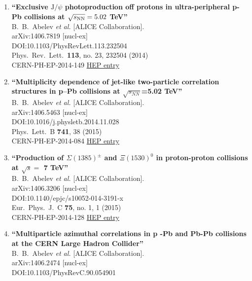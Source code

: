 \begin{enumerate}
\item%
{\bf ``Exclusive $\mathrm{J/}\psi$ photoproduction off protons in ultra-peripheral p-Pb collisions at $\sqrt{s_{\rm NN}}=5.02$ TeV''}
  \\{}B.~B.~Abelev {\it et al.} [ALICE Collaboration].
  \\{}arXiv:1406.7819 [nucl-ex]
  \\{}DOI:10.1103/PhysRevLett.113.232504
  \\{}Phys.\ Rev.\ Lett.\  {\bf 113}, no. 23, 232504 (2014)
  \\{}CERN-PH-EP-2014-149
\href{http://inspirehep.net/record/1303903}{HEP entry}
\item%
{\bf ``Multiplicity dependence of jet-like two-particle correlation structures in p–Pb collisions at $\sqrt{s_{NN}}$=5.02 TeV''}
  \\{}B.~B.~Abelev {\it et al.} [ALICE Collaboration].
  \\{}arXiv:1406.5463 [nucl-ex]
  \\{}DOI:10.1016/j.physletb.2014.11.028
  \\{}Phys.\ Lett.\ B {\bf 741}, 38 (2015)
  \\{}CERN-PH-EP-2014-084
\href{http://inspirehep.net/record/1301858}{HEP entry}
\item%
{\bf ``Production of $\Sigma(1385)^{\pm}$ and $\Xi(1530)^{0}$ in proton-proton collisions at $\sqrt{s}=$ 7 TeV''}
  \\{}B.~B.~Abelev {\it et al.} [ALICE Collaboration].
  \\{}arXiv:1406.3206 [nucl-ex]
  \\{}DOI:10.1140/epjc/s10052-014-3191-x
  \\{}Eur.\ Phys.\ J.\ C {\bf 75}, no. 1, 1 (2015)
  \\{}CERN-PH-EP-2014-128
\href{http://inspirehep.net/record/1300380}{HEP entry}
\item%
{\bf ``Multiparticle azimuthal correlations in p -Pb and Pb-Pb collisions at the CERN Large Hadron Collider''}
  \\{}B.~B.~Abelev {\it et al.} [ALICE Collaboration].
  \\{}arXiv:1406.2474 [nucl-ex]
  \\{}DOI:10.1103/PhysRevC.90.054901

\end{enumerate}
